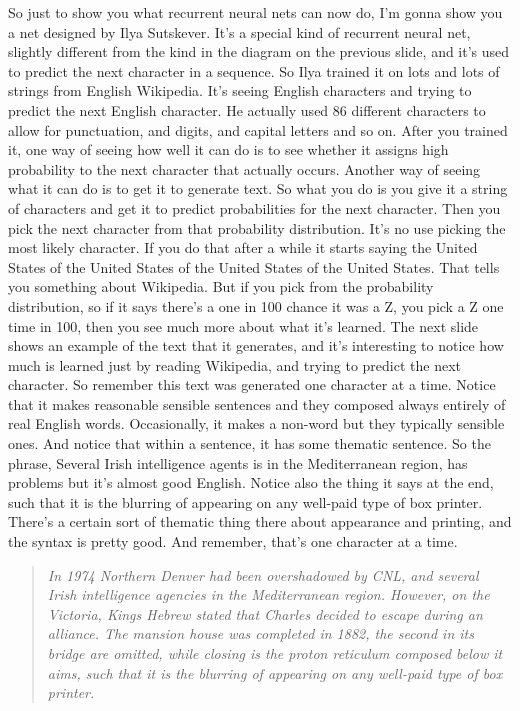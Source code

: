 \begin{multicols}{2}
\begin{footnotesize}
So just to show you what recurrent neural nets can now do, I'm gonna show you a net designed by Ilya Sutskever. It's a special kind of recurrent neural net, slightly different from the kind in the diagram on the previous slide, and it's used to predict the next character in a sequence. So Ilya trained it on lots and lots of strings from English Wikipedia. It's seeing English characters and trying to predict the next English character. He actually used 86 different characters to allow for punctuation, and digits, and capital letters and so on. After you trained it, one way of seeing how well it can do is to see whether it assigns high probability to the next character that actually occurs. Another way of seeing what it can do is to get it to generate text. So what you do is you give it a string of characters and get it to predict probabilities for the next character. Then you pick the next character from that probability distribution. It's no use picking the most likely character. If you do that after a while it starts saying the United States of the United States of the United States of the United States. That tells you something about Wikipedia. But if you pick from the probability distribution, so if it says there's a one in 100 chance it was a Z, you pick a Z one time in 100, then you see much more about what it's learned. The next slide shows an example of the text that it generates, and it's interesting to notice how much is learned just by reading Wikipedia, and trying to predict the next character. So remember this text was generated one character at a time. Notice that it makes reasonable sensible sentences and they composed always entirely of real English words. Occasionally, it makes a non-word but they typically sensible ones. And notice that within a sentence, it has some thematic sentence. So the phrase, Several Irish intelligence agents is in the Mediterranean region, has problems but it's almost good English. Notice also the thing it says at the end, such that it is the blurring of appearing on any well-paid type of box printer. There's a certain sort of thematic thing there about appearance and printing, and the syntax is pretty good. And remember, that's one character at a time.

\begin{quote}
\textit{In 1974 Northern Denver had been
overshadowed by CNL, and several Irish
intelligence agencies in the Mediterranean
region. However, on the Victoria, Kings
Hebrew stated that Charles decided to
escape during an alliance. The mansion
house was completed in 1882, the second in
its bridge are omitted, while closing is the
proton reticulum composed below it aims,
such that it is the blurring of appearing on any
well-paid type of box printer.}
\end{quote}



\end{footnotesize}
\end{multicols}
